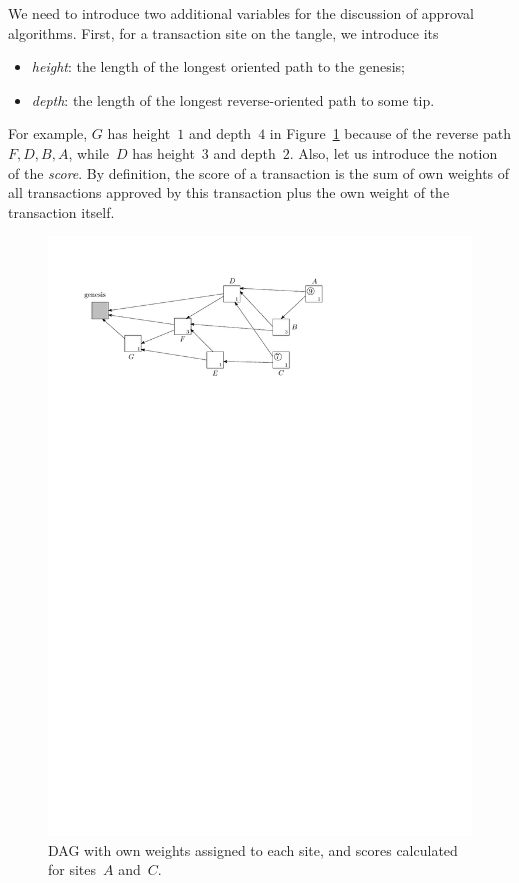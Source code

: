 \documentclass[12pt]{article}
\begin{document}
We need 
to introduce two additional variables for the discussion 
of approval algorithms.
First, for a transaction site on the tangle, 
we introduce its
\begin{itemize}
 \item \emph{height}: the length of the longest
oriented path to the genesis;
 \item \emph{depth}: the length of the longest
reverse-oriented path to some tip.
\end{itemize}
For example, 
$G$ has 
height~$1$ and depth~$4$ 
in Figure~\ref{f_reverse_weights}
because of the reverse 
 path $F,D,B,A$, 
while~$D$ has height~$3$ and depth~$2$.
Also, let us introduce the notion of the \emph{score}.
By definition, the score of a transaction
 is the sum of own weights of all transactions approved by this 
transaction plus
 the own weight of the transaction itself.
\begin{figure}
 \centering \includegraphics{reverse_weights} 
\caption{
DAG with own weights assigned to each site, 
and scores calculated for sites~$A$ and~$C$.}
\label{f_reverse_weights}
\end{figure}
\end{document}

